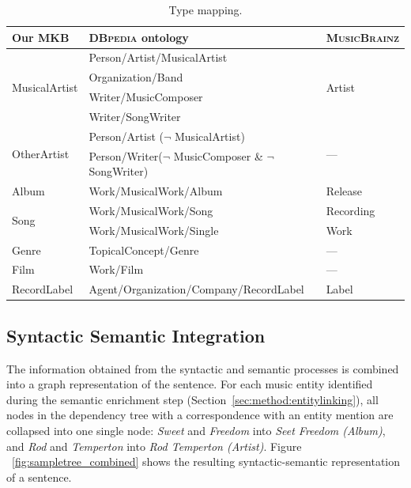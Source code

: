\begin{table}[ht!]
\scriptsize
\centering
	\begin{tabular}{ | l | l | l | }
	\hline
\textbf{Our \textsc{MKB}} & \textbf{\textsc{DBpedia} ontology} & \textbf{\textsc{MusicBrainz}} \\
	\hline
\multirow{4}{*}{MusicalArtist} & Person/Artist/MusicalArtist & \multirow{4}{*}{Artist}\\ 
& Organization/Band & \\ 
& Writer/MusicComposer & \\ 
& Writer/SongWriter & \\
	\hline
\multirow{2}{*}{OtherArtist} & Person/Artist ($\neg$ MusicalArtist) & \multirow{2}{*}{---} \\
& Person/Writer($\neg$ MusicComposer \& $\neg$ SongWriter) & \\
    \hline
Album & Work/MusicalWork/Album & Release \\
    \hline
\multirow{2}{*}{Song} & Work/MusicalWork/Song & Recording \\
& Work/MusicalWork/Single & Work \\
    \hline
Genre & TopicalConcept/Genre & --- \\
    \hline
Film & Work/Film & --- \\
    \hline
RecordLabel & Agent/Organization/Company/RecordLabel & Label \\
    \hline
	\end{tabular}
	\caption{Type mapping.}
	\label{tbl:type_mapping}
\end{table}
%

\subsection{Syntactic Semantic Integration}
\label{sec:method:syntsemint}

The information obtained from the syntactic and semantic processes is combined into a graph representation of the sentence. For each music entity identified during the semantic enrichment step (Section~\ref{sec:method:entitylinking}), all nodes in the dependency tree with a correspondence with an entity mention are collapsed into one single node: \textit{Sweet} and \textit{Freedom} into \textit{Seet Freedom (Album)}, and \textit{Rod} and \textit{Temperton} into \textit{Rod Temperton (Artist)}. Figure ~\ref{fig:sampletree_combined} shows the resulting syntactic-semantic representation of a sentence.

